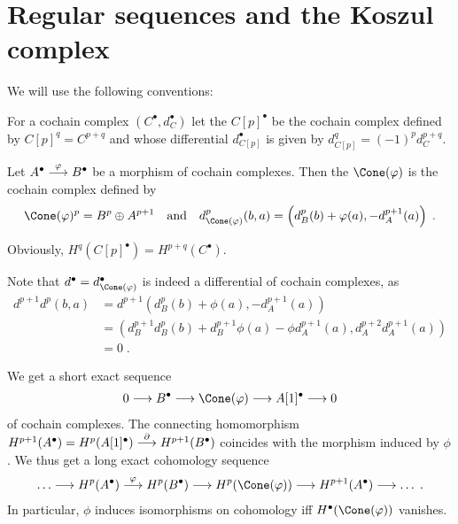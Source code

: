 \documentclass[a4paper,parskip=half,numbers=enddot, DIV=12]{scrreprt}
\begin{document}
\section{Regular sequences and the Koszul complex}
We will use the following conventions: 
\begin{defi}
	\begin{alphanumerate}
		\item {}For a cochain complex $(C^\bullet, d_{C}^\bullet)$ let the  $C[p]^\bullet$ be the cochain complex defined by $C[p]^q=C^{p+q}$ and whose differential $d_{C[p]}^\bullet$ is given by $d_{C[p]}^q=(-1)^pd_{C}^{p+q}$.
		\item Let $A^\bullet\morphism[\phi]B^\bullet$ be a morphism of cochain complexes. Then the  $\Cone(\phi)$ is the cochain complex defined by 
		\begin{align}\lbl{eq:cone}
			\Cone(\phi)^p=B^p\oplus A^{p+1}\quad\text{and}\quad d_{\Cone(\phi)}^p(b,a)=\left(d_B^p(b)+\phi(a),-d_A^{p+1}(a)\right)\;.
		\end{align}
	\end{alphanumerate}
\end{defi}
\begin{rem}
	\begin{alphanumerate}
		\item Obviously, $H^q(C[p]^\bullet)=H^{p+q}(C^\bullet)$.
		\item Note that $d^\bullet=d_{\Cone(\phi)}^ \bullet$ is indeed a differential of cochain complexes, as
		\begin{align*}
			d^{p+1}d^p(b,a)&=d^{p+1}\left(d_B^p(b)+\phi(a),-d_A^{p+1}(a)\right)\\
			&=\left(d_B^{p+1}d_B^p(b)+d_B^{p+1}\phi(a)-\phi d_A^{p+1}(a),d_A^{p+2}d_A^{p+1}(a)\right)\\
			&=0\;.
		\end{align*}
		\item We get a short exact sequence
		\begin{align*}
			0\morphism B^\bullet\morphism\Cone(\phi)\morphism A[1]^\bullet\morphism 0
		\end{align*}
		of cochain complexes. The connecting homomorphism $H^{p+1}(A^\bullet)=H^p(A[1]^\bullet)\morphism[\partial]H^{p+1}(B^\bullet)$ coincides with the morphism induced by $\phi$. We thus get a long exact cohomology sequence
		\begin{align}\lbl{eq:MappingConeSeq}
			\ldots\morphism H^p(A^\bullet)\morphism[\phi]H^p(B^\bullet)\morphism H^p(\Cone(\phi))\morphism H^{p+1}(A^\bullet)\morphism\ldots\;.
		\end{align}
		In particular, $\phi$ induces isomorphisms on cohomology iff $H^\bullet(\Cone(\phi))$ vanishes.
	\end{alphanumerate}
\end{rem}
\end{document}
